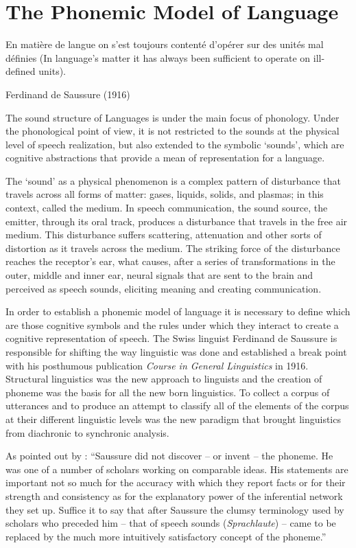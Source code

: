 \chapter{The Phonemic Model of Language}
\epigraph{En matière de langue on s’est toujours contenté d’opérer sur des unités mal définies (In language's matter it has always been sufficient to operate on ill-defined units).}{Ferdinand de Saussure (1916)}

The sound structure of Languages is under the main focus of phonology. Under the phonological point of view, it is not restricted to the sounds at the physical level of speech realization, but also extended to the symbolic `sounds', which are cognitive abstractions that provide a mean of representation for a language.

The `sound' as a physical phenomenon is a complex pattern of disturbance that travels across all forms of matter: gases, liquids, solids, and plasmas; in this context, called the medium. In speech communication, the sound source, the emitter, through its oral track, produces a disturbance that travels in the free air medium. This disturbance suffers scattering, attenuation and other sorts of distortion as it travels across the medium. The striking force of the disturbance reaches the receptor's ear, what causes, after a series of transformations in the outer, middle and inner ear, neural signals that are sent to the brain and perceived as speech sounds, eliciting meaning and creating communication.

In order to establish a phonemic model of language it is necessary to define which are those cognitive symbols and the rules under which they interact to create a cognitive representation of speech. The Swiss linguist Ferdinand de Saussure is responsible for shifting the way linguistic was done and established a break point with his posthumous publication \textit{Course in General Linguistics} in 1916. Structural linguistics was the new approach to linguists and the creation of phoneme was the basis for all the new born linguistics. To collect a corpus of utterances and to produce an attempt to classify all of the elements of the corpus at their different linguistic levels was the new paradigm that brought linguistics from diachronic to synchronic analysis.

As pointed out by \cite{capek1983}: ``Saussure did not discover -- or invent -- the phoneme. He was one of a number of scholars working on comparable ideas. His statements are important not so much for the accuracy with which they report facts or for their strength and consistency as for the explanatory power of the inferential network they set up. Suffice it to say that after Saussure the clumsy terminology used by scholars who preceded him -- that of speech sounds (\textit{Sprachlaute})  -- came to be replaced by the much more intuitively satisfactory concept of the phoneme.''

